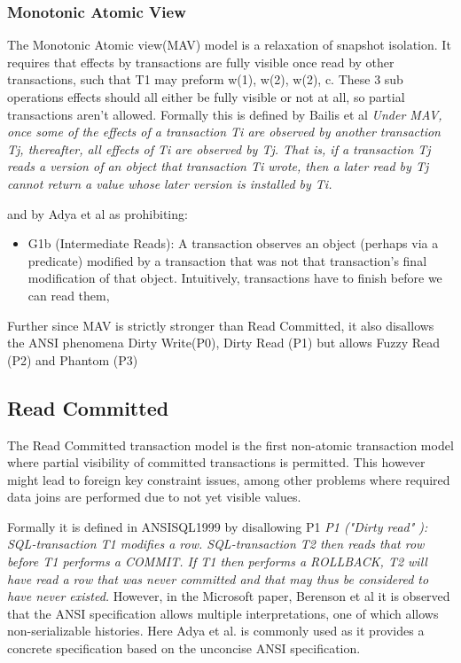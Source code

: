 \documentclass[a4paper,10pt,titlepage]{report}
\begin{document}
\subsubsection{Monotonic Atomic View}
The Monotonic Atomic view(MAV) model is a relaxation of snapshot isolation. It requires that effects by transactions are fully visible once read by other transactions, such that T1 may preform w(1), w(2), w(2), c. These 3 sub operations effects should all either be fully visible or not at all, so partial transactions aren't allowed. Formally this is defined by Bailis et al \cite{HighlyAvailableTransactionsVirtuesandLimitations}
\textit{Under MAV, once some of the effects of a transaction Ti are observed by another transaction Tj, thereafter, all effects of Ti are observed by Tj. That is, if a transaction Tj reads a version of an object that transaction Ti wrote, then a later read by Tj cannot return a value whose later version is installed by Ti.}

and by Adya et al\cite{Adya99weakconsistency} as prohibiting:
\begin{itemize}
    \item G1b (Intermediate Reads): A transaction observes an object (perhaps via a predicate) modified by a transaction that was not that transaction's final modification of that object. Intuitively, transactions have to finish before we can read them,
\end{itemize}

Further since MAV is strictly stronger than Read Committed, it also disallows the ANSI phenomena Dirty Write(P0), Dirty Read (P1) but allows Fuzzy Read (P2) and Phantom (P3)

\subsection{Read Committed}
The Read Committed transaction model is the first non-atomic transaction model where partial visibility of committed transactions is permitted. This however might lead to foreign key constraint issues, among other problems where required data joins are performed due to not yet visible values.
\\ \vspace{5mm}

Formally it is defined in ANSISQL1999\cite{ansisql1999} by disallowing P1
\textit{P1 ("Dirty read" ): SQL-transaction T1 modifies a row. SQL-transaction T2 then reads that row before T1 performs a COMMIT. If T1 then performs a ROLLBACK, T2 will have read a row that was never committed and that may thus be considered to have never existed.} However, in the Microsoft paper, Berenson et al \cite{Berensonetal} it is observed that the ANSI specification allows multiple interpretations, one of which allows non-serializable histories. Here Adya et al.\cite{Adya99weakconsistency} is commonly used as it provides a concrete specification based on the unconcise ANSI specification.
\\ \vspace{5mm}
\end{document}
